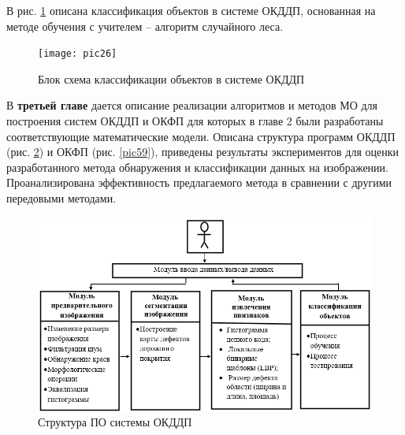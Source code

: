 В рис. \ref{pic26} описана классификация объектов в системе ОКДДП, основанная на методе обучения с учителем -- алгоритм случайного леса.

\begin{figure}[ht!]
\centering
\texttt{[image: pic26]}
\caption{Блок схема классификации объектов в системе ОКДДП}
	\label{pic26}
		\end{figure}	

В \textbf {третьей главе} дается описание реализации алгоритмов и методов МО для построения систем ОКДДП и ОКФП для которых в главе 2 были разработаны соответствующие математические модели. Описана структура программ ОКДДП (рис. \ref{pic47}) и ОКФП (рис. \ref{pic59}), приведены результаты экспериментов для оценки разработанного метода обнаружения и классификации данных на изображении. Проанализирована эффективность предлагаемого метода в сравнении с другими передовыми методами. 
\begin{figure}[ht!]
\centering
\vspace{-0.8em}
\includegraphics [width=1\linewidth]{images/pic47.png}
\caption{Структура ПО системы ОКДДП} \label{pic47}
\end{figure}

